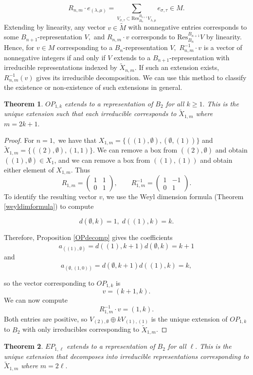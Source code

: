 \documentclass{amsart}
\theoremstyle{plain}
\newtheorem{theorem}{Theorem}[section]
\theoremstyle{definition}
\begin{document}
$$ R_{n,m}\cdot e_{(\lambda,\mu)}= \sum_{V_{\sigma,\tau}\subset \mathrm{Res}^{B_{n+1}}_{B_n}V_{\lambda,\mu }}e_{\sigma,\tau}\in M.$$
Extending by linearity, any vector $v \in \tilde M$ with nonnegative entries corresponds to some $B_{n+1}$-representation $V, $ and  $R_{n,m}\cdot v$ corresponds to $\mathrm{Res}^{B_{n+1}}_{B_n} V$ by linearity. Hence, for $v\in M $ corresponding to a $B_n$-representation $V,$ $R_{n,m}^{-1}\cdot v$ is a vector of nonnegative integers if and only if $V$ extends to a $B_{n+1}$-representation with irreducible representations indexed by $\tilde{X}_{n,m}$. If such an extension exists, $R_{n,m}^{-1}(v)$ gives its irreducible decomposition.  We can use this method to classify the existence or non-existence of such extensions in general.  
 
\begin{theorem}
$OP_{1,k} $ extends to a representation of $B_2$ for all $k \geq 1.$  This is the unique extension such that each irreducible corresponds to $\tilde{X}_{1,m}$ where $m=2k+1.$
\end{theorem}

\begin{proof}
For $n=1,$ we have that $X_{1,m} = \{ ((1), \emptyset) , (\emptyset, (1)) \}$ and $\tilde{X}_{1,m} = \{ ((2), \emptyset), (1, 1) \}$. We can remove a box from $((2), \emptyset )$ and obtain $((1), \emptyset ) \in X_1$, and we can remove a box from $((1), (1))$ and obtain either element of $X_{1,m}$. Thus
$$
R_{1,m}=\begin{pmatrix}
1 & 1 \\
0 & 1
\end{pmatrix}, \qquad 
R_{1,m}^{-1}= \begin{pmatrix}
1 & -1 \\
0 & 1
\end{pmatrix}.
$$
To identify the resulting vector $v$, we use the Weyl dimension formula (Theorem \ref{weyldimformula}) to compute  

$$d(\emptyset,k)=1, \; d((1),k)=k.$$  


Therefore, Proposition \ref{OPdecomp} gives the coefficients $$a_{((1),\emptyset)}= d((1),k+1)d(\emptyset,k)= k+1$$ and $$a_{(\emptyset,(1,0))}= d(\emptyset,k+1)d((1),k)=k,$$

so the vector corresponding to $OP_{1,k}$ is $$v=(k+1,k).$$ We can now compute 
$$ R_{1,m}^{-1}\cdot v= (1,k).$$ Both entries are positive, so $V_{(2),\emptyset}\oplus kV_{(1),(1)}$ is the unique extension of $OP_{1,k}$ to $B_2$ with only irreducibles corresponding to $\tilde X_{1,m}$.
\end{proof} 
\begin{theorem}
     $EP_{1,\ell}$ extends to a representation of $B_2$  for  all $\ell.$ This is the unique extension that decomposes into irreducible representations corresponding to $\tilde{X}_{1, m}$ where $m=2\ell .$
\end{theorem}
   
\end{document}
